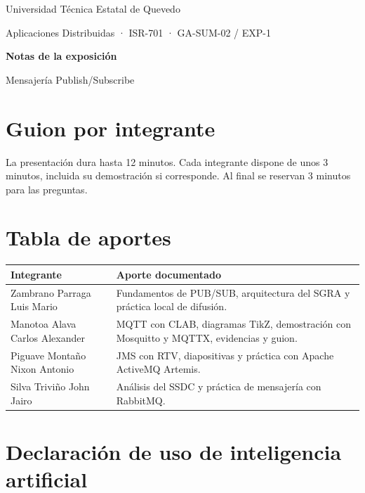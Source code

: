 \documentclass[10pt,a4paper]{article}
\begin{document}
{\large Universidad Técnica Estatal de Quevedo}\par
{\small Aplicaciones Distribuidas · ISR-701 · GA-SUM-02 / EXP-1}\par
\vspace{.4em}
{\LARGE\bfseries Notas de la exposición}\par
{\large Mensajería Publish/Subscribe}\par

\section{Guion por integrante}

La presentación dura hasta 12 minutos. Cada integrante dispone de unos
3 minutos, incluida su demostración si corresponde. Al final se reservan
3 minutos para las preguntas.











\section{Tabla de aportes}

\begin{tabularx}{\textwidth}{@{}p{}X@{}}
  \toprule
  \textbf{Integrante} & \textbf{Aporte documentado} \\
  \midrule
  Zambrano Parraga Luis Mario &
  Fundamentos de PUB/SUB, arquitectura del SGRA y práctica local de difusión. \\
  Manotoa Alava Carlos Alexander &
  MQTT con CLAB, diagramas TikZ, demostración con Mosquitto y MQTTX,
  evidencias y guion. \\
  Piguave Montaño Nixon Antonio &
  JMS con RTV, diapositivas y práctica con Apache ActiveMQ Artemis. \\
  Silva Triviño John Jairo &
  Análisis del SSDC y práctica de mensajería con RabbitMQ. \\
  \bottomrule
\end{tabularx}

\section{Declaración de uso de inteligencia artificial}
\end{document}
